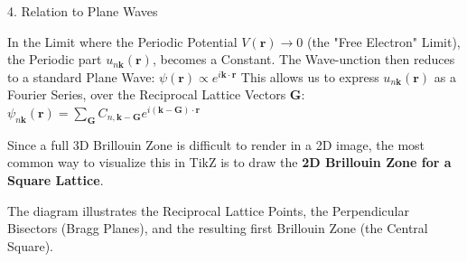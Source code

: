 \documentclass[a4paper, 10pt, onepage]{elegantbook}
\begin{document}
{    4. Relation to Plane Waves  

In the Limit where the Periodic Potential $V(\mathbf{r}) \to 0$ (the "Free Electron" Limit), the Periodic part 
$u_{n\mathbf{k}}(\mathbf{r})$, becomes a Constant.  
The Wave-unction then reduces to a standard Plane Wave:  
$\psi(\mathbf{r}) \propto e^{i\mathbf{k} \cdot \mathbf{r}} $
This allows us to express $u_{n\mathbf{k}}(\mathbf{r})$ as a Fourier Series, over the Reciprocal Lattice Vectors 
$\mathbf{G}$:  
$\psi_{n\mathbf{k}}(\mathbf{r}) = \sum_{\mathbf{G}} C_{n, \mathbf{k}-\mathbf{G}} e^{i(\mathbf{k}-\mathbf{G}) \cdot 
\mathbf{r}}$

Since a full 3D Brillouin Zone is difficult to render in a 2D image, the most common way to visualize this in TikZ is 
to draw the \textbf{2D Brillouin Zone for a Square Lattice}.  

The diagram illustrates the Reciprocal Lattice Points, the Perpendicular Bisectors (Bragg Planes), and the resulting 
first Brillouin Zone (the Central Square).

}
\end{document}
